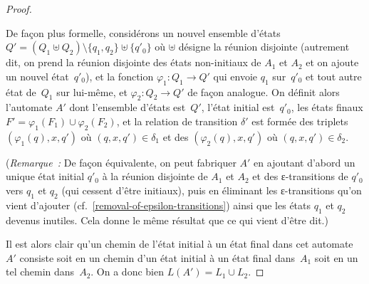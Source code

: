 \documentclass[12pt,a4paper]{article}
\theoremstyle{definition}
\begin{document}
\begin{proof}
\begin{center}
\end{center}

De façon plus formelle, considérons un nouvel ensemble d'états $Q' =
(Q_1 \uplus Q_2) \setminus \{q_1,q_2\} \uplus \{q'_0\}$ où $\uplus$
désigne la réunion disjointe (autrement dit, on prend la réunion
disjointe des états non-initiaux de $A_1$ et $A_2$ et on ajoute un
nouvel état $q'_0$), et la fonction $\varphi_1\colon Q_1 \to Q'$ qui
envoie $q_1$ sur $q'_0$ et tout autre état de $Q_1$ sur lui-même, et
$\varphi_2\colon Q_2 \to Q'$ de façon analogue.  On définit alors
l'automate $A'$ dont l'ensemble d'états est $Q'$, l'état initial
est $q'_0$, les états finaux $F' = \varphi_1(F_1) \cup
\varphi_2(F_2)$, et la relation de transition $\delta'$ est formée des
triplets $(\varphi_1(q),x,q')$ où $(q,x,q') \in \delta_1$ et des
$(\varphi_2(q),x,q')$ où $(q,x,q') \in \delta_2$.

(\emph{Remarque : } De façon équivalente, on peut fabriquer $A'$ en
ajoutant d'abord un unique état initial $q'_0$ à la réunion disjointe
de $A_1$ et $A_2$ et des ε-transitions de $q'_0$ vers $q_1$ et $q_2$
(qui cessent d'être initiaux), puis en éliminant les ε-transitions
qu'on vient d'ajouter (cf. \ref{removal-of-epsilon-transitions}) ainsi
que les états $q_1$ et $q_2$ devenus inutiles.  Cela donne le même
résultat que ce qui vient d'être dit.)

Il est alors clair qu'un chemin de l'état initial à un état final dans
cet automate $A'$ consiste soit en un chemin d'un état initial à un
état final dans $A_1$ soit en un tel chemin dans $A_2$.  On a donc
bien $L(A') = L_1 \cup L_2$.
\end{proof}
\end{document}
